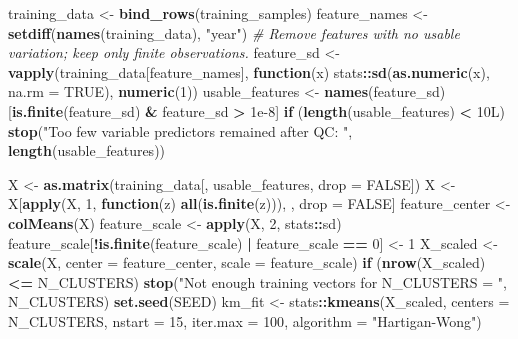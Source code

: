 \documentclass[
]{article}
\newenvironment{Shaded}{\begin{snugshade}}{\end{snugshade}}
\newcommand{\AttributeTok}[1]{\textcolor[rgb]{0.13,0.29,0.53}{#1}}
\newcommand{\CommentTok}[1]{\textcolor[rgb]{0.56,0.35,0.01}{\textit{#1}}}
\newcommand{\ConstantTok}[1]{\textcolor[rgb]{0.56,0.35,0.01}{#1}}
\newcommand{\ControlFlowTok}[1]{\textcolor[rgb]{0.13,0.29,0.53}{\textbf{#1}}}
\newcommand{\DataTypeTok}[1]{\textcolor[rgb]{0.13,0.29,0.53}{#1}}
\newcommand{\DecValTok}[1]{\textcolor[rgb]{0.00,0.00,0.81}{#1}}
\newcommand{\FloatTok}[1]{\textcolor[rgb]{0.00,0.00,0.81}{#1}}
\newcommand{\FunctionTok}[1]{\textcolor[rgb]{0.13,0.29,0.53}{\textbf{#1}}}
\newcommand{\NormalTok}[1]{#1}
\newcommand{\OtherTok}[1]{\textcolor[rgb]{0.56,0.35,0.01}{#1}}
\newcommand{\SpecialCharTok}[1]{\textcolor[rgb]{0.81,0.36,0.00}{\textbf{#1}}}
\newcommand{\StringTok}[1]{\textcolor[rgb]{0.31,0.60,0.02}{#1}}
\begin{document}
\begin{Shaded}
\begin{Highlighting}[]
\NormalTok{training\_data }\OtherTok{\textless{}{-}} \FunctionTok{bind\_rows}\NormalTok{(training\_samples)}
\NormalTok{feature\_names }\OtherTok{\textless{}{-}} \FunctionTok{setdiff}\NormalTok{(}\FunctionTok{names}\NormalTok{(training\_data), }\StringTok{"year"}\NormalTok{)}
\CommentTok{\# Remove features with no usable variation; keep only finite observations.}
\NormalTok{feature\_sd }\OtherTok{\textless{}{-}} \FunctionTok{vapply}\NormalTok{(training\_data[feature\_names], }\ControlFlowTok{function}\NormalTok{(x) stats}\SpecialCharTok{::}\FunctionTok{sd}\NormalTok{(}\FunctionTok{as.numeric}\NormalTok{(x), }\AttributeTok{na.rm =} \ConstantTok{TRUE}\NormalTok{), }\FunctionTok{numeric}\NormalTok{(}\DecValTok{1}\NormalTok{))}
\NormalTok{usable\_features }\OtherTok{\textless{}{-}} \FunctionTok{names}\NormalTok{(feature\_sd)[}\FunctionTok{is.finite}\NormalTok{(feature\_sd) }\SpecialCharTok{\&}\NormalTok{ feature\_sd }\SpecialCharTok{\textgreater{}} \FloatTok{1e{-}8}\NormalTok{]}
\ControlFlowTok{if}\NormalTok{ (}\FunctionTok{length}\NormalTok{(usable\_features) }\SpecialCharTok{\textless{}} \DecValTok{10}\DataTypeTok{L}\NormalTok{) }\FunctionTok{stop}\NormalTok{(}\StringTok{"Too few variable predictors remained after QC: "}\NormalTok{, }\FunctionTok{length}\NormalTok{(usable\_features))}

\NormalTok{X }\OtherTok{\textless{}{-}} \FunctionTok{as.matrix}\NormalTok{(training\_data[, usable\_features, }\AttributeTok{drop =} \ConstantTok{FALSE}\NormalTok{])}
\NormalTok{X }\OtherTok{\textless{}{-}}\NormalTok{ X[}\FunctionTok{apply}\NormalTok{(X, }\DecValTok{1}\NormalTok{, }\ControlFlowTok{function}\NormalTok{(z) }\FunctionTok{all}\NormalTok{(}\FunctionTok{is.finite}\NormalTok{(z))), , drop }\OtherTok{=} \ConstantTok{FALSE}\NormalTok{]}
\NormalTok{feature\_center }\OtherTok{\textless{}{-}} \FunctionTok{colMeans}\NormalTok{(X)}
\NormalTok{feature\_scale }\OtherTok{\textless{}{-}} \FunctionTok{apply}\NormalTok{(X, }\DecValTok{2}\NormalTok{, stats}\SpecialCharTok{::}\NormalTok{sd)}
\NormalTok{feature\_scale[}\SpecialCharTok{!}\FunctionTok{is.finite}\NormalTok{(feature\_scale) }\SpecialCharTok{|}\NormalTok{ feature\_scale }\SpecialCharTok{==} \DecValTok{0}\NormalTok{] }\OtherTok{\textless{}{-}} \DecValTok{1}
\NormalTok{X\_scaled }\OtherTok{\textless{}{-}} \FunctionTok{scale}\NormalTok{(X, }\AttributeTok{center =}\NormalTok{ feature\_center, }\AttributeTok{scale =}\NormalTok{ feature\_scale)}
\ControlFlowTok{if}\NormalTok{ (}\FunctionTok{nrow}\NormalTok{(X\_scaled) }\SpecialCharTok{\textless{}=}\NormalTok{ N\_CLUSTERS) }\FunctionTok{stop}\NormalTok{(}\StringTok{"Not enough training vectors for N\_CLUSTERS = "}\NormalTok{, N\_CLUSTERS)}
\FunctionTok{set.seed}\NormalTok{(SEED)}
\NormalTok{km\_fit }\OtherTok{\textless{}{-}}\NormalTok{ stats}\SpecialCharTok{::}\FunctionTok{kmeans}\NormalTok{(X\_scaled, }\AttributeTok{centers =}\NormalTok{ N\_CLUSTERS, }\AttributeTok{nstart =} \DecValTok{15}\NormalTok{, }\AttributeTok{iter.max =} \DecValTok{100}\NormalTok{, }\AttributeTok{algorithm =} \StringTok{"Hartigan{-}Wong"}\NormalTok{)}


\end{Highlighting}
\end{Shaded}
\end{document}
